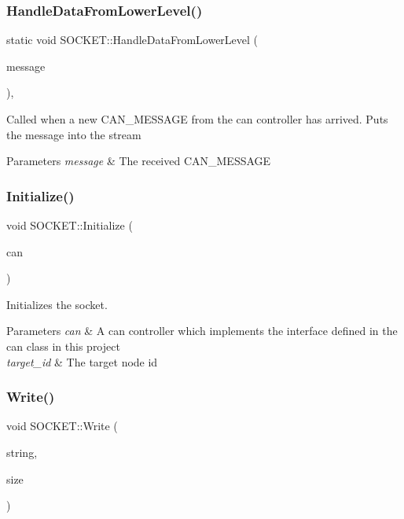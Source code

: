 \subsubsection{\texorpdfstring{Handle\+Data\+From\+Lower\+Level()}{HandleDataFromLowerLevel()}}
{\footnotesize\ttfamily static void S\+O\+C\+K\+E\+T\+::\+Handle\+Data\+From\+Lower\+Level (\begin{DoxyParamCaption}\item[{\hyperlink{struct_can_message}{Can\+Message} \&}]{message }\end{DoxyParamCaption})\hspace{0.3cm}{\ttfamily [inline]}, {\ttfamily [static]}}

Called when a new C\+A\+N\+\_\+\+M\+E\+S\+S\+A\+GE from the can controller has arrived. Puts the message into the stream 
\begin{DoxyParams}{Parameters}
{\em message} & The received C\+A\+N\+\_\+\+M\+E\+S\+S\+A\+GE \\
\hline
\end{DoxyParams}
\hypertarget{class_s_o_c_k_e_t_a69219c6c89e78afcd46df2e0af34a341}{}\label{class_s_o_c_k_e_t_a69219c6c89e78afcd46df2e0af34a341} 
\subsubsection{\texorpdfstring{Initialize()}{Initialize()}}
{\footnotesize\ttfamily void S\+O\+C\+K\+E\+T\+::\+Initialize (\begin{DoxyParamCaption}\item[{\hyperlink{class_c_a_n}{C\+AN} $\ast$}]{can }\end{DoxyParamCaption})\hspace{0.3cm}{\ttfamily [inline]}}

Initializes the socket. 
\begin{DoxyParams}{Parameters}
{\em can} & A can controller which implements the interface defined in the can class in this project \\
\hline
{\em target\+\_\+id} & The target node id \\
\hline
\end{DoxyParams}
\hypertarget{class_s_o_c_k_e_t_ad8ee6b81c9f30267406412a95264abed}{}\label{class_s_o_c_k_e_t_ad8ee6b81c9f30267406412a95264abed} 
\subsubsection{\texorpdfstring{Write()}{Write()}}
{\footnotesize\ttfamily void S\+O\+C\+K\+E\+T\+::\+Write (\begin{DoxyParamCaption}\item[{uint8\+\_\+t $\ast$}]{string,  }\item[{uint16\+\_\+t}]{size }\end{DoxyParamCaption})\hspace{0.3cm}{\ttfamily [virtual]}}

